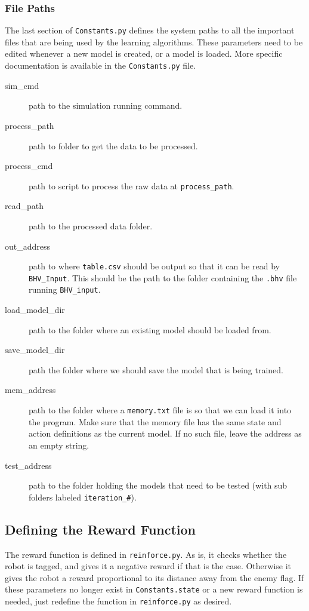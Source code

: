 \documentclass[onecolumn,letterpaper,11pt]{article}
\begin{document}
\subsubsection{File Paths}
The last section of \texttt{Constants.py} defines the system paths to all the important files that are being used by the learning algorithms. These parameters need to be edited whenever a new model is created, or a model is loaded. More specific documentation is available in the \texttt{Constants.py} file. 
\begin{description}
	\item[sim\_cmd] path to the simulation running command.
	
	\item[process\_path] path to folder to get the data to be processed.
	
	\item[process\_cmd] path to script to process the raw data at \texttt{process\_path}.
	
	\item[read\_path] path to the processed data folder.
	
	\item[out\_address] path to where \texttt{table.csv} should be output so that it can be read by \texttt{BHV\_Input}. This should be the path to the folder containing the \texttt{.bhv} file running \texttt{BHV\_input}.
	
	\item[load\_model\_dir] path to the folder where an existing model should be loaded from.
	
	\item[save\_model\_dir] path the folder where we should save the model that is being trained.
	
	\item[mem\_address] path to the folder where a \texttt{memory.txt} file is so that we can load it into the program. Make sure that the memory file has the same state and action definitions as the current model. If no such file, leave the address as an empty string.
	
	\item[test\_address] path to the folder holding the models that need to be tested (with sub folders labeled \texttt{iteration\_\#}).
\end{description}

\subsection{Defining the Reward Function}
The reward function is defined in \texttt{reinforce.py}. As is, it checks whether the robot is tagged, and gives it a negative reward if that is the case. Otherwise it gives the robot a reward proportional to its distance away from the enemy flag. If these parameters no longer exist in \texttt{Constants.state} or a new reward function is needed, just redefine the function in \texttt{reinforce.py} as desired.
\end{document}
